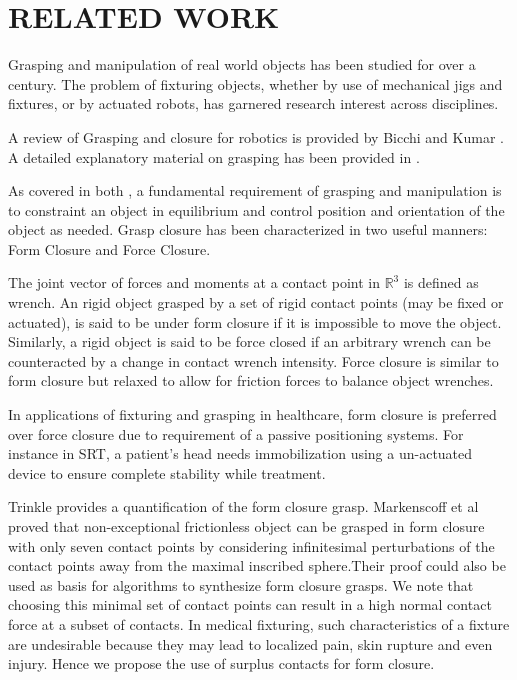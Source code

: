 
\section{RELATED WORK}
\label{sec:relatedWork}

Grasping and manipulation of real world objects has been studied for over 
a century. The problem of fixturing objects, whether by use of mechanical 
jigs and fixtures, or by actuated robots, has garnered research interest across
disciplines.

A review of Grasping and closure for robotics is provided by 
Bicchi and Kumar \cite{bicchi2000robotic}. A detailed explanatory material 
on grasping has been provided in \cite{prattichizzo2008grasping}. 

As covered in both \cite{bicchi2000robotic, prattichizzo2008grasping}, a 
fundamental requirement of grasping and manipulation is to constraint an object 
in equilibrium and control position and orientation of the object as needed. 
Grasp closure has been characterized in two useful manners: Form Closure and
Force Closure. 

The joint vector of forces and moments at a contact point in $\mathbb{R}^3$ is 
defined as wrench. An rigid object grasped by a set of rigid contact points 
(may be fixed or actuated), is said to be under form closure if it is impossible to 
move the object. Similarly, a rigid object is said to be force closed if an 
arbitrary wrench can be counteracted by a change in contact wrench intensity.
Force closure is similar to form closure but relaxed to allow for friction 
forces to balance object wrenches. 

In applications of fixturing and grasping in healthcare, form closure
is preferred  over force closure due to requirement of a passive positioning systems.  For instance in SRT, a patient's head needs immobilization using a un-actuated device to ensure complete stability while treatment. 

Trinkle \cite{trinkle1992quantitative} provides a quantification of the form closure grasp. Markenscoff et al \cite{markenscoff1990geometry} proved that non-exceptional frictionless object can be grasped in form closure with 
only seven contact points by considering infinitesimal perturbations of the contact points away from the maximal inscribed sphere.Their proof could also be used as basis for algorithms to synthesize form closure grasps. We note that choosing this minimal set of contact points can result in a high normal contact force at a subset of contacts. In medical fixturing, such characteristics of a fixture are undesirable because they may lead to localized pain, skin rupture 
and even injury. Hence we propose the use of surplus contacts for form closure. 


